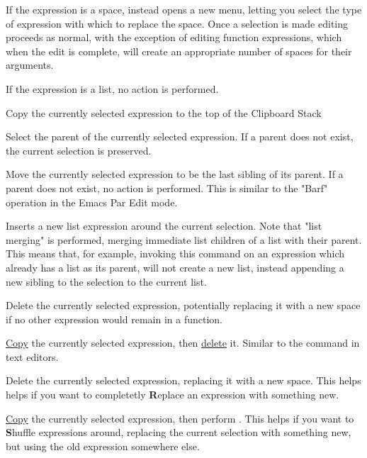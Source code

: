 If the expression is a space, instead opens a new menu,
letting you select the type of expression with which to replace the space. 
Once a selection is made editing proceeds as normal, with the exception of
editing function expressions, which when the edit is complete, will create
an appropriate number of spaces for their arguments.

If the expression is a list, no action is performed.


Copy the currently selected expression to the top of the Clipboard Stack

Select the parent of the currently selected expression. If a parent does not
exist, the current selection is preserved.

Move the currently selected expression to be the last sibling of its parent.
If a parent does not exist, no action is performed.
This is similar to the "Barf" operation in the Emacs Par Edit mode.


Inserts a new list expression around the current selection. Note that "list
merging" is performed, merging immediate list children of a list with their
parent. This means that, for example, invoking this command on an expression
which already has a list as its parent, will not create a new list, instead
appending a new sibling to the selection to the current list.

Delete the currently selected expression, potentially replacing it with a new
space if no other expression would remain in a function.


\hyperref[cmd:copy]{Copy} the currently selected expression, then
\hyperref[cmd:delete]{delete} it. Similar to the  command in
text editors.


Delete the currently selected expression, replacing it with a new space. This
helps helps if you want to completetly \textbf{R}eplace an expression with
something new.

\hyperref[cmd:copy]{Copy} the currently selected expression, then perform
\hyperref[cmd:delete_blank]{}. This helps if you want
to \textbf{S}huffle expressions around, replacing the current selection with
something new, but using the old expression somewhere else.

